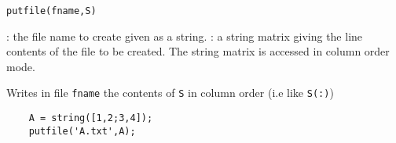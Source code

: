 
\begin{mandesc}
\end{mandesc}
\begin{calling_sequence}
\begin{verbatim}
putfile(fname,S)
\end{verbatim}
\end{calling_sequence}
\begin{parameters}
  \begin{varlist}
    : the file name to create given as a string.
    : a string matrix giving the line contents of the file to be created. The 
    string matrix is accessed in column order mode.
  \end{varlist}
\end{parameters}

\begin{mandescription}
  Writes in file \verb+fname+ the contents of \verb+S+ in column order (i.e like \verb+S(:)+)
\end{mandescription}

\begin{examples}
  \begin{Verbatim} 
    A = string([1,2;3,4]);
    putfile('A.txt',A);
  \end{Verbatim}
\end{examples}

\begin{manseealso}
\end{manseealso}

